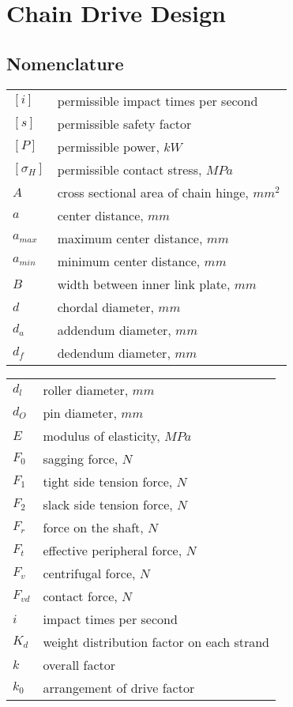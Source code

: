 \chapter{Chain Drive Design}
\section{Nomenclature}
\begin{tabular}[t]{lp{6.5cm}}
		$ [i] $ & permissible impact times per second\\
		$ [s] $ & permissible safety factor\\
		$ [P] $ & permissible power, $ \unit{kW} $\\
		$ [\sigma_H] $ & permissible contact stress, $ \unit{MPa} $\\
		$ A $ & cross sectional area of chain hinge, $ \unit{mm^2} $\\
		$ a $ & center distance, $ \unit{mm} $\\
		$ a_{max} $ & maximum center distance, $ \unit{mm} $\\
		$ a_{min} $ & minimum center distance, $ \unit{mm} $\\
		$ B $ & width between inner link plate, $ \unit{mm} $\\
		$ d $ & chordal diameter, $ \unit{mm} $\\
		$ d_a $ & addendum diameter, $ \unit{mm} $\\
		$ d_f $ & dedendum diameter, $ \unit{mm} $\\ 
\end{tabular}
\begin{tabular}[t]{lp{6.5cm}}
		$ d_l $ & roller diameter, $ \unit{mm} $\\
		$ d_O $ & pin diameter, $ \unit{mm} $\\
		$ E $ & modulus of elasticity, $ \unit{MPa} $\\
		$ F_0 $ & sagging force, $ \unit{N} $\\
		$ F_1 $ & tight side tension force, $ \unit{N} $\\
		$ F_2 $ & slack side tension force, $ \unit{N} $\\
		$ F_r $ & force on the shaft, $ \unit{N} $\\
		$ F_t $ & effective peripheral force, $ \unit{N} $\\
		$ F_v $ & centrifugal force, $ \unit{N} $\\
		$ F_{vd} $ & contact force, $ \unit{N} $\\
		$ i $ & impact times per second\\
		$ K_d $ & weight distribution factor on each strand\\
		$ k $ & overall factor\\
		$ k_0 $ & arrangement of drive factor\\
\end{tabular}\newpage
